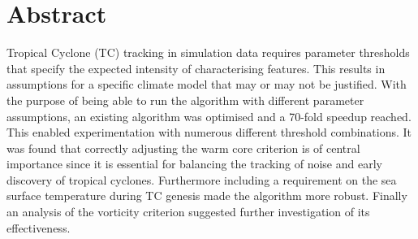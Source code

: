 
 \setcounter{tocdepth}{2}
 \tableofcontents



\chapter*{Abstract}
Tropical Cyclone (TC) tracking in simulation data requires parameter thresholds that specify the expected intensity of characterising features. This results in assumptions for a specific climate model that may or may not be justified. With the purpose of being able to run the algorithm with different parameter assumptions, an existing algorithm was optimised and a 70-fold speedup reached. This enabled experimentation with numerous different threshold combinations. It was found that correctly adjusting the warm core criterion is of central importance since it is essential for balancing the tracking of noise and early discovery of tropical cyclones. Furthermore including a requirement on the sea surface temperature during TC genesis made the algorithm more robust. Finally an analysis of the vorticity criterion suggested further investigation of its effectiveness.